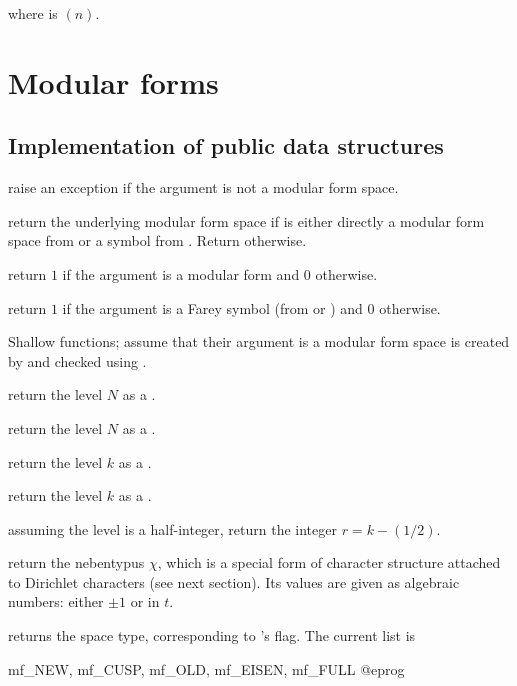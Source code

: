  where  is $(n)$.

\chapter{Modular forms}

\section{Implementation of public data structures}

 raise an exception if the argument is not a
modular form space.

 return the underlying modular form space
if  is either directly a modular form space from 
or a symbol from . Return  otherwise.

 return $1$ if the argument is a modular form
and $0$ otherwise.

 return $1$ if the argument is a Farey symbol
(from  or ) and $0$ otherwise.


Shallow functions; assume that their argument is a modular form space
is created by  and checked using .

 return the level $N$ as a .

 return the level $N$ as a .

 return the level $k$ as a .

 return the level $k$ as a .

 assuming the level is a half-integer, return
the integer $r = k - (1/2)$.

 return the nebentypus $\chi$, which is a
 special form of character structure attached to Dirichlet characters (see
 next section). Its values are given as algebraic numbers: either $\pm1$ or
  in $t$.

 returns the space type, corresponding
to 's  flag. The current list is

\bprog
mf_NEW, mf_CUSP, mf_OLD, mf_EISEN, mf_FULL
@eprog

